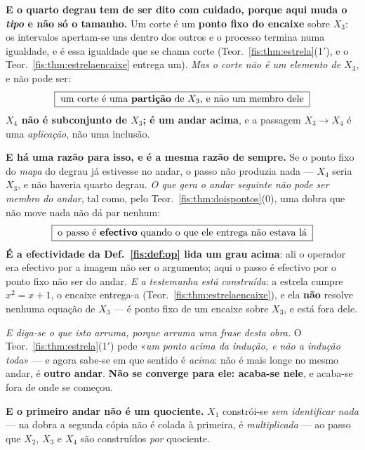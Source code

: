 \documentclass[livro.tex]{subfiles}
\begin{document}
\medskip\noindent\textbf{E o quarto degrau tem de ser dito com cuidado, porque
aqui muda o \emph{tipo} e não só o tamanho.} Um corte é um \textbf{ponto fixo do
encaixe} sobre $X_3$: os intervalos apertam-se uns dentro dos outros e o processo
termina numa igualdade, e é essa igualdade que se chama corte
(Teor.~\ref{fis:thm:estrela}(1$'$), e o Teor.~\ref{fis:thm:estrelaencaixe}
entrega um). \emph{Mas o corte não é um elemento de $X_3$}, e não pode ser:
\[
\boxed{\;\text{um corte é uma \textbf{partição} de } X_3\text{, e não um membro dele}\;}
\]
\textbf{$X_4$ não é subconjunto de $X_3$; é um andar acima}, e a passagem
$X_3\to X_4$ é uma \emph{aplicação}, não uma inclusão.

\medskip\noindent\textbf{E há uma razão para isso, e é a mesma razão de sempre.}
Se o ponto fixo do \emph{mapa} do degrau já estivesse no andar, o passo não produzia nada ---
$X_4$ seria $X_3$, e não haveria quarto degrau. \emph{O que gera o andar seguinte
não pode ser membro do andar}, tal como, pelo
Teor.~\ref{fis:thm:doispontos}(0), uma dobra que não move nada não dá par nenhum:
\[
\boxed{\;\text{o passo é \textbf{efectivo} quando o que ele entrega não estava lá}\;}
\]
\textbf{É a efectividade da Def.~\ref{fis:def:op} lida um grau acima}: ali o
operador era efectivo por a imagem não ser o argumento; aqui o passo é efectivo
por o ponto fixo não ser do andar. \emph{E a testemunha está construída}: a
estrela cumpre $x^{2}=x+1$, o encaixe entrega-a
(Teor.~\ref{fis:thm:estrelaencaixe}), e ela \textbf{não} resolve nenhuma equação
de $X_3$ --- é ponto fixo de um encaixe sobre $X_3$, e está fora dele.

\medskip\noindent\emph{E diga-se o que isto arruma, porque arruma uma frase desta
obra.} O Teor.~\ref{fis:thm:estrela}(1$'$) pede «\emph{um ponto acima da indução,
e não a indução toda}» --- e agora sabe-se em que sentido é \emph{acima}: não é
mais longe no mesmo andar, é \textbf{outro andar}. \textbf{Não se converge para
ele: acaba-se nele}, e acaba-se fora de onde se começou.

\medskip\noindent\textbf{E o primeiro andar não é um quociente.} $X_1$
constrói-se \emph{sem identificar nada} --- na dobra a segunda cópia não é colada
à primeira, é \emph{multiplicada} --- ao passo que $X_2$, $X_3$ e $X_4$ são
construídos \emph{por} quociente.
\end{document}
